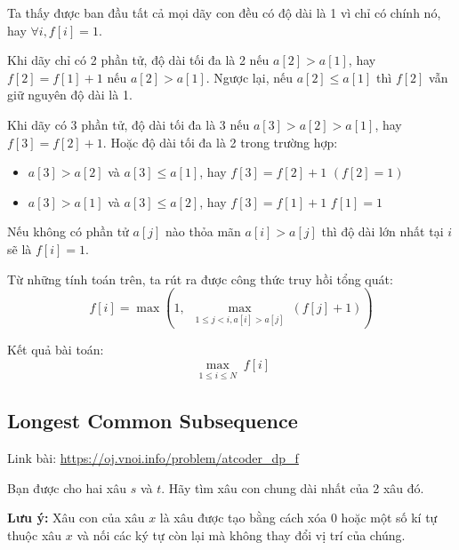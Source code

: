 \documentclass{article}
\begin{document}
\vspace{1em}

Ta thấy được ban đầu tất cả mọi dãy con đều có độ dài là 1 vì chỉ có chính nó, hay $\forall i, f[i] = 1$.

\vspace{1em}

Khi dãy chỉ có 2 phần tử, độ dài tối đa là 2 nếu $a[2] > a[1]$, hay $f[2] = f[1] + 1$ nếu $a[2] > a[1]$. Ngược lại, nếu $a[2] \leq a[1]$ thì $f[2]$ vẫn giữ nguyên độ dài là 1.

\vspace{1em}

Khi dãy có 3 phần tử, độ dài tối đa là 3 nếu $a[3] > a[2] > a[1]$, hay $f[3] = f[2] + 1$. Hoặc độ dài tối đa là 2 trong trường hợp:
\begin{itemize}
    \item $a[3] > a[2]$ và $a[3] \leq a[1]$, hay $f[3] = f[2] + 1$ $(f[2] = 1)$
    \item $a[3] > a[1]$ và $a[3] \leq a[2]$, hay $f[3] = f[1] + 1$ $f[1] = 1$
\end{itemize}
Nếu không có phần tử $a[j]$ nào thỏa mãn $a[i] > a[j]$ thì độ dài lớn nhất tại $i$ sẽ là $f[i] =  1$.

\vspace{1em}

Từ những tính toán trên, ta rút ra được công thức truy hồi tổng quát:
\[
    f[i] = \max \left( 1,\ \max_{\substack{1 \leq j < i, a[i] > a[j]}} \left( f[j] + 1 \right) \right)
\]

\vspace{1em}

Kết quả bài toán:
\[
    \max_{\substack{1 \leq i \leq N}} f[i] 
\]


\subsection{Longest Common Subsequence}
Link bài: \url{https://oj.vnoi.info/problem/atcoder_dp_f}

\begin{tcolorbox}[
    colback=blue!5,        %
    colframe=blue!75!black,%
    title={Đề bài}
]
Bạn được cho hai xâu $s$ và $t$. Hãy tìm xâu con chung dài nhất của 2 xâu đó.

\textbf{Lưu ý: }Xâu con của xâu $x$ là xâu được tạo bằng cách xóa $0$ hoặc một số kí tự thuộc xâu $x$ và nối các ký tự còn lại mà không thay đổi vị trí của chúng.
\end{tcolorbox}
\end{document}
